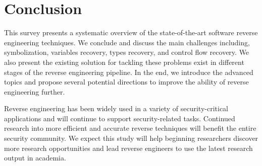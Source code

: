 \chapter{Conclusion}\label{sec-conclusion}

This survey presents a systematic overview of the state-of-the-art software reverse engineering techniques. We conclude and discuss the main challenges including, symbolization, variables recovery, types recovery, and control flow recovery.
We also present the existing solution for tackling these problems exist in different stages of the reverse engineering pipeline. In the end, we introduce the advanced topics and propose several potential directions to improve the ability of reverse engineering further.

Reverse engineering has been widely used in a variety of security-critical applications and will continue to support security-related tasks. Continued research into more efficient and accurate reverse techniques will benefit the entire security community. We expect this study will help beginning researchers discover more research opportunities and lead reverse engineers to use the latest research output in academia.

\newpage
